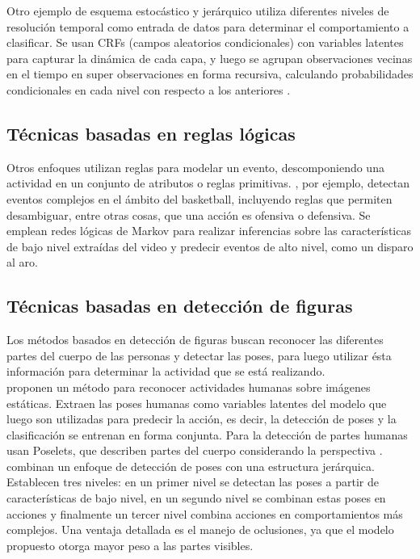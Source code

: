 Otro ejemplo de esquema estocástico y jerárquico utiliza diferentes niveles de resolución temporal como entrada de datos para determinar el comportamiento a clasificar. Se usan CRFs (campos aleatorios condicionales) con variables latentes para capturar la dinámica de cada capa, y luego se agrupan observaciones vecinas en el tiempo en super observaciones en forma recursiva, calculando probabilidades condicionales en cada nivel con respecto a los anteriores \citep{Song2013}.

\subsection{Técnicas basadas en reglas lógicas}

Otros enfoques utilizan reglas para modelar un evento, descomponiendo una actividad en un conjunto de atributos o reglas primitivas. 
\citep{Morariu2011}, por ejemplo,  detectan eventos complejos en el ámbito del basketball, incluyendo reglas que permiten desambiguar, entre otras cosas, que una acción es ofensiva o defensiva. Se emplean redes lógicas de Markov para realizar inferencias sobre las características de bajo nivel extraídas del video y predecir eventos de alto nivel, como un disparo al aro.

\subsection{Técnicas basadas en detección de figuras}

Los métodos basados en detección de figuras buscan reconocer las diferentes partes del cuerpo de las personas y detectar las poses, para luego utilizar ésta información para determinar la actividad que se está realizando. \\

\citep{Yang2010} proponen un método para reconocer actividades humanas sobre imágenes estáticas. Extraen las poses humanas como variables latentes del modelo que luego son utilizadas para predecir la acción, es decir, la detección de poses y la clasificación se entrenan en forma conjunta. Para la detección de partes humanas usan Poselets, que describen partes del cuerpo considerando la perspectiva \citep{Bourdev2009}. \\

\citep{Lillo2014} combinan un enfoque de detección de poses con una estructura jerárquica. Establecen tres niveles: en un primer nivel se detectan las poses a partir de características de bajo nivel, en un segundo nivel se combinan estas poses en acciones y finalmente un tercer nivel combina acciones en comportamientos más complejos. Una ventaja detallada es el manejo de oclusiones, ya que el modelo propuesto otorga mayor peso a las partes visibles.

